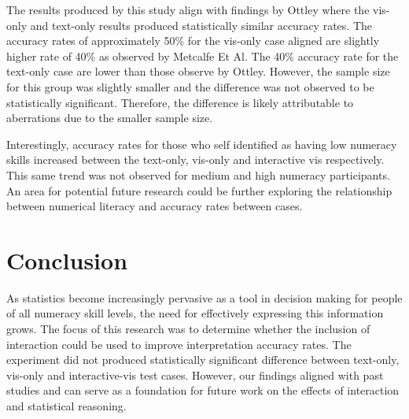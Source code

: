The results produced by this study align with findings by Ottley where the
vis-only and text-only results produced statistically similar accuracy rates.
The accuracy rates of approximately 50\% for the vis-only case aligned are
slightly higher rate of 40\% as observed by Metcalfe Et Al. The 40\% accuracy
rate for the text-only case are lower than those observe by Ottley. However,
the sample size for this group was slightly smaller and the difference was
not observed to be statistically significant. Therefore, the difference is
likely attributable to aberrations due to the smaller sample size.

Interestingly, accuracy rates for those who self identified as having low
numeracy skills increased between the text-only, vis-only and interactive vis
respectively. This same trend was not observed for medium and high numeracy
participants. An area for potential future research could be further
exploring the relationship between numerical literacy and accuracy rates
between cases.


\section{Conclusion}
\label{sec:conclusion}
As statistics become increasingly pervasive as a tool in decision making for
people of all numeracy skill levels, the need for effectively expressing this
information grows. The focus of this research was to determine whether the
inclusion of interaction could be used to improve interpretation accuracy
rates. The experiment did not produced statistically significant difference
between text-only, vis-only and interactive-vis test cases. However, our
findings aligned with past studies and can serve as a foundation for future
work on the effects of interaction and statistical reasoning.